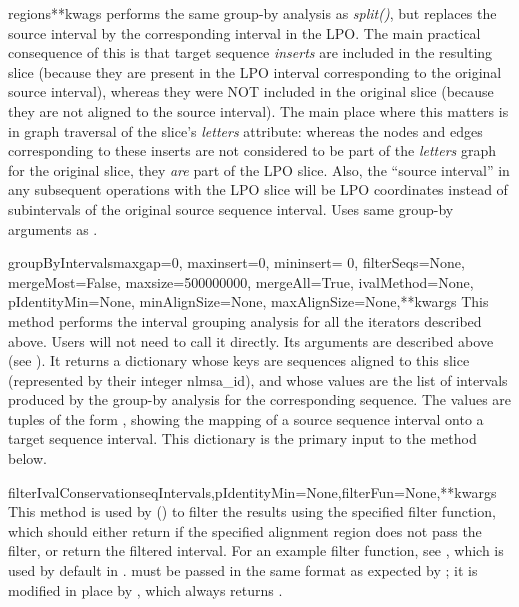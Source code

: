 \documentclass{howto}
\begin{document}
\begin{funcdesc}{regions}{**kwags}
  performs the same group-by analysis as {\em split()}, but replaces
  the source interval by the corresponding interval in the LPO.  The main
  practical consequence of this is that target sequence {\em inserts}
  are included in the resulting slice (because they are present in the LPO
  interval corresponding to the original source interval), whereas they
  were NOT included in the original slice (because they are not aligned
  to the source interval).  The main place where this matters is in graph
  traversal of the slice's {\em letters} attribute: whereas the nodes
  and edges corresponding to these inserts are not considered to be part
  of the {\em letters} graph for the original slice, they {\em are} part of the
  LPO slice.  Also, the ``source interval'' in any subsequent operations
  with the LPO slice will be LPO coordinates instead of subintervals of the
  original source sequence interval.
  Uses same group-by arguments as .
\end{funcdesc}

\begin{funcdesc}{groupByIntervals}{maxgap=0, maxinsert=0, mininsert= 0, filterSeqs=None, mergeMost=False, maxsize=500000000, mergeAll=True, ivalMethod=None, pIdentityMin=None, minAlignSize=None, maxAlignSize=None,**kwargs}
  This method performs the interval grouping analysis for all the iterators
  described above.  Users will not need to call it directly.  Its arguments
  are described above (see ).  It returns a dictionary
  whose keys are sequences aligned to this slice (represented by their integer nlmsa_id),
  and whose values are
  the list of intervals produced by the group-by analysis for the corresponding
  sequence.  The values are tuples of the form
  , showing the
  mapping of a source sequence interval onto a target sequence interval.
  This dictionary is the primary input to the 
  method below.
\end{funcdesc}

\begin{funcdesc}{filterIvalConservation}{seqIntervals,pIdentityMin=None,filterFun=None,**kwargs}
  This method is used by () to filter the results
  using the specified  filter function, which should either
  return  if the specified alignment region does not pass the filter,
  or return the filtered interval.  For an example
  filter function, see , which is used by default 
  in .   must be passed in
  the same format as expected by ; it is modified in
  place by , which always returns .
\end{funcdesc}
\end{document}
